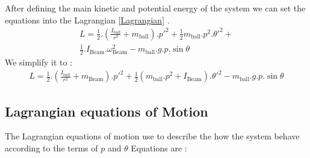 \documentclass{article}
\begin{document}
After defining the main kinetic and potential energy of the system we can set the 
equations into the Lagrangian \ref{Lagrangian} .
\begin{multline}
		L = \frac{1}{2}.(\frac{I_{\text{ball}}}{r^2}+m_{\text{ball}}).p'^2 + \frac{1}{2} m_{\text{ball}}.p^2.\theta'^2 +\\
		\frac{1}{2}.I_{\text{Beam}}.\omega_{\text{Beam}}^2- m_{\text{ball}}.g.p.\sin{\theta}
\end{multline}
We simplify it to :
\begin{equation}
	\begin{split}
		L = \frac{1}{2}.(\frac{I_{\text{ball}}}{r^2}+m_{\text{Beam}}).p'^2 + \frac{1}{2}(m_{\text{ball}}.p^2 + I_{\text{Beam}}).\theta'^2 - m_{\text{ball}}.g.p.\sin{\theta} 
	\end{split}
\end{equation}

\newpage
\subsection{Lagrangian equations of Motion}
The Lagrangian equations of motion use to describe the how the system behave according to the terms of $p$ and $\theta$
Equations are :
\end{document}
